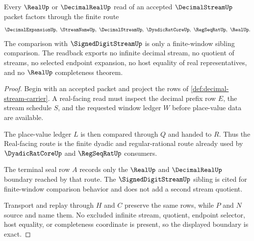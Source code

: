 \begin{theorem}
\label{thm:decimal-stream-real-readback-boundary}
Every $\RealUp$ or $\DecimalRealUp$ read of an accepted $\DecimalStreamUp$ packet factors through the finite route
$$
\DecimalExpansionUp,\ \StreamNameUp,\ \DecimalStreamUp,\ \DyadicRatCoreUp,\ \RegSeqRatUp,\ \RealUp .
$$
The comparison with $\SignedDigitStreamUp$ is only a finite-window sibling comparison. The readback exports no infinite decimal stream, no quotient of streams, no selected endpoint expansion, no host equality of real representatives, and no $\RealUp$ completeness theorem.
\end{theorem}
\begin{proof}
Begin with an accepted packet and project the rows of \autoref{def:decimal-stream-carrier}. A real-facing read must inspect the decimal prefix row $E$, the stream schedule $S$, and the requested window ledger $W$ before place-value data are available.

The place-value ledger $L$ is then compared through $Q$ and handed to $R$. Thus the Real-facing route is the finite dyadic and regular-rational route already used by $\DyadicRatCoreUp$ and $\RegSeqRatUp$ consumers.

The terminal seal row $A$ records only the $\RealUp$ and $\DecimalRealUp$ boundary reached by that route. The $\SignedDigitStreamUp$ sibling is cited for finite-window comparison behavior and does not add a second stream quotient.

Transport and replay through $H$ and $C$ preserve the same rows, while $P$ and $N$ source and name them. No excluded infinite stream, quotient, endpoint selector, host equality, or completeness coordinate is present, so the displayed boundary is exact.
\end{proof}


\begin{closurestatus}{\DecimalStreamUp}
  \theoryclosure{\seedClosure}
  \formalstatus{\unformalizedV}
\end{closurestatus}
